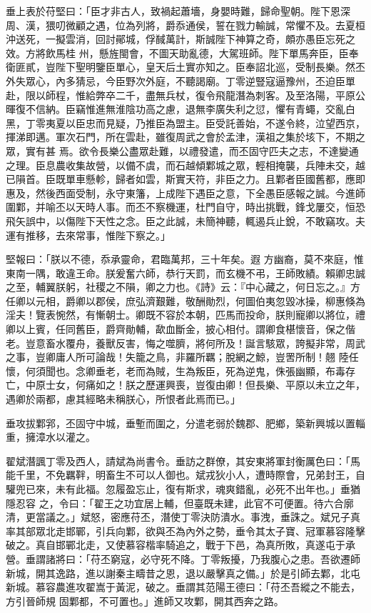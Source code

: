 \begin{pinyinscope}
 垂上表於苻堅曰：「臣才非古人，致禍起蕭墻，身嬰時難，歸命聖朝。陛下恩深周、漢，猥叨微顧之遇，位為列將，爵忝通侯，誓在戮力輸誠，常懼不及。去夏桓沖送死，一擬雲消，回討鄖城，俘馘萬計，斯誠陛下神算之奇，頗亦愚臣忘死之效。方將飲馬桂
 州，懸旌閩會，不圖天助亂德，大駕班師。陛下單馬奔臣，臣奉衛匪貳，豈陛下聖明鑒臣單心，皇天后土實亦知之。臣奉詔北巡，受制長樂。然丕外失眾心，內多猜忌，今臣野次外庭，不聽謁廟。丁零逆豎寇逼豫州，丕迫臣單赴，限以師程，惟給弊卒二千，盡無兵杖，復令飛龍潛為刺客。及至洛陽，平原公暉復不信納。臣竊惟進無淮陰功高之慮，退無李廣失利之愆，懼有青蠅，交亂白黑，丁零夷夏以臣忠而見疑，乃推臣為盟主。臣受託善始，不遂令終，泣望西京，揮涕即邁。軍次石門，所在雲赴，雖復周武之會於孟津，漢祖之集於垓下，不期之眾，實有甚
 焉。欲令長樂公盡眾赴難，以禮發遣，而丕固守匹夫之志，不達變通之理。臣息農收集故營，以備不虞，而石越傾鄴城之眾，輕相掩襲，兵陣未交，越已隕首。臣既單車懸軫，歸者如雲，斯實天符，非臣之力。且鄴者臣國舊都，應即惠及，然後西面受制，永守東籓，上成陛下遇臣之意，下全愚臣感報之誠。今進師圍鄴，并喻丕以天時人事。而丕不察機運，杜門自守，時出挑戰，鋒戈屢交，恒恐飛矢誤中，以傷陛下天性之念。臣之此誠，未簡神聽，輒遏兵止銳，不敢竊攻。夫運有推移，去來常事，惟陛下察之。」



 堅報曰：「朕以不德，忝承靈命，君臨萬邦，三十年矣。遐
 方幽裔，莫不來庭，惟東南一隅，敢違王命。朕爰奮六師，恭行天罰，而玄機不弔，王師敗績。賴卿忠誠之至，輔翼朕躬，社稷之不隕，卿之力也。《詩》云：『中心藏之，何日忘之。』方任卿以元相，爵卿以郡侯，庶弘濟艱難，敬酬勛烈，何圖伯夷忽毀冰操，柳惠倏為淫夫！覽表惋然，有慚朝士。卿既不容於本朝，匹馬而投命，朕則寵卿以將位，禮卿以上賓，任同舊臣，爵齊勛輔，歃血斷金，披心相付。謂卿食椹懷音，保之偕老。豈意畜水覆舟，養獸反害，悔之噬臍，將何所及！誕言駭眾，誇擬非常，周武之事，豈卿庸人所可論哉！失籠之鳥，非羅所羈；脫網之鯨，豈罟所制！翹
 陸任懷，何須聞也。念卿垂老，老而為賊，生為叛臣，死為逆鬼，侏張幽顯，布毒存亡，中原士女，何痛如之！朕之歷運興喪，豈復由卿！但長樂、平原以未立之年，遇卿於兩都，慮其經略未稱朕心，所恨者此焉而已。」



 垂攻拔鄴郛，丕固守中城，垂塹而圍之，分遣老弱於魏郡、肥鄉，築新興城以置輜重，擁漳水以灌之。



 翟斌潛諷丁零及西人，請斌為尚書令。垂訪之群僚，其安東將軍封衡厲色曰：「馬能千里，不免羈靽，明畜生不可以人御也。斌戎狄小人，遭時際會，兄弟封王，自驩兜已來，未有此福。忽履盈忘止，復有斯求，魂爽錯亂，必死不出年也。」垂猶隱忍容
 之，令曰：「翟王之功宜居上輔，但臺既未建，此官不可便置。待六合廓清，更當議之。」斌怒，密應苻丕，潛使丁零決防潰水。事洩，垂誅之。斌兄子真率其部眾北走邯鄲，引兵向鄴，欲與丕為內外之勢，垂令其太子寶、冠軍慕容隆擊破之。真自邯鄲北走，又使慕容楷率騎追之，戰于下邑，為真所敗，真遂屯于承營。垂謂諸將曰：「苻丕窮寇，必守死不降。丁零叛擾，乃我腹心之患。吾欲遷師新城，開其逸路，進以謝秦主疇昔之恩，退以嚴擊真之備。」於是引師去鄴，北屯新城。慕容農進攻翟嵩于黃泥，破之。垂謂其范陽王德曰：「苻丕吾縱之不能去，方引晉師規
 固鄴都，不可置也。」進師又攻鄴，開其西奔之路。




\end{pinyinscope}
